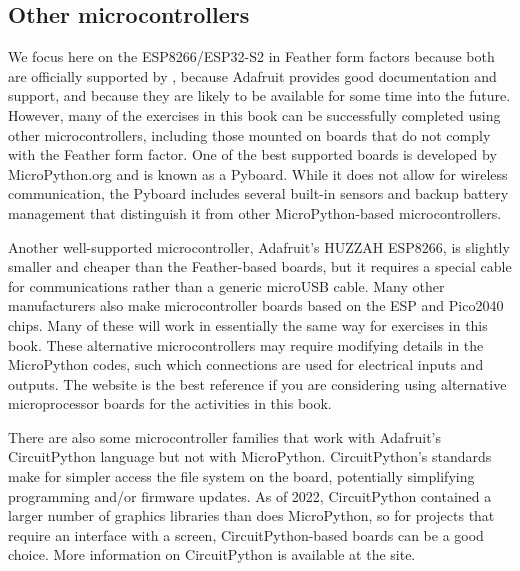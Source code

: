 %



\subsection{Other microcontrollers}

We focus here on the ESP8266/ESP32-S2 in Feather form factors because both are officially supported by , because Adafruit provides good documentation and support, and because they are likely to be available for some time into the future. 
However, many of the exercises in this book can be successfully completed using other microcontrollers, including those mounted on boards that do not comply with the Feather form factor. 
One of the best supported boards is developed by MicroPython.org and is known as a Pyboard.  
While it does not allow for wireless communication, the Pyboard includes several built-in sensors and backup battery management that distinguish it from other MicroPython-based microcontrollers.

Another well-supported microcontroller, Adafruit's HUZZAH ESP8266, is slightly smaller and cheaper than the Feather-based boards, but it requires a special cable for communications rather than a generic microUSB cable.
Many other manufacturers also make microcontroller boards based on the ESP and Pico2040 chips.
Many of these will work in essentially the same way for exercises in this book.
These alternative microcontrollers may require modifying details in the MicroPython codes, such which connections are used for electrical inputs and outputs.
The  website is the best reference if you are considering using alternative microprocessor boards for the activities in this book.

There are also some microcontroller families that work with Adafruit's CircuitPython language but not with MicroPython. CircuitPython's standards make for simpler access the file system on the board, potentially simplifying programming and/or firmware updates. As of 2022, CircuitPython contained a larger number of graphics libraries than does MicroPython, so for projects that require an interface with a screen, CircuitPython-based boards can be a good choice. More information on CircuitPython is available at the  site.

